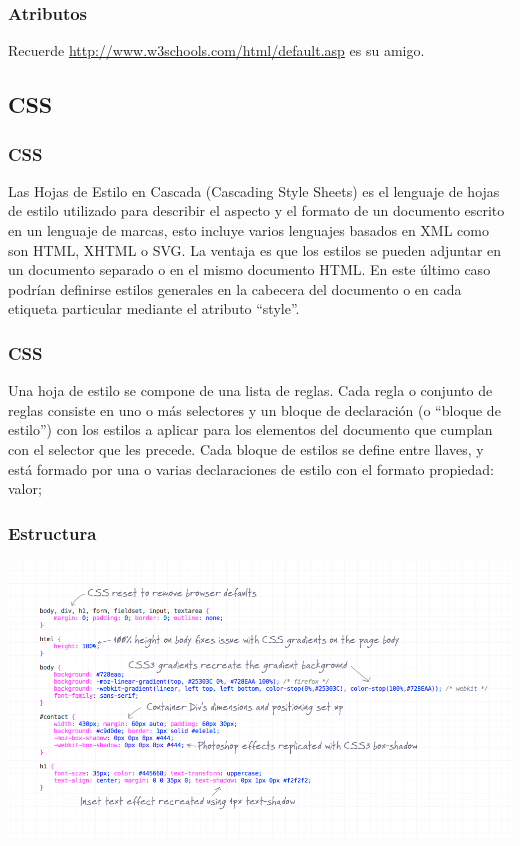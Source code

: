 \documentclass[12pt]{beamer}
\begin{document}
\begin{frame}
 \frametitle{Atributos}
 Recuerde \href{http://www.w3schools.com/html/default.asp}{http://www.w3schools.com/html/default.asp} es su amigo.
\end{frame}

\subsection{CSS}

\begin{frame}
 \frametitle{CSS}
 Las Hojas de Estilo en Cascada (Cascading Style Sheets) es el lenguaje de hojas de estilo utilizado para describir el aspecto y el formato de un documento escrito en un lenguaje de marcas, esto incluye varios lenguajes basados en XML como son HTML, XHTML o SVG.
 \newline
 La ventaja es que los estilos se pueden adjuntar en un documento separado o en el mismo documento HTML. En este último caso podrían definirse estilos generales en la cabecera del documento o en cada etiqueta particular mediante el atributo ``style''.
\end{frame}

\begin{frame}
 \frametitle{CSS}
 Una hoja de estilo se compone de una lista de reglas. Cada regla o conjunto de reglas consiste en uno o más selectores y un bloque de declaración (o ``bloque de estilo'') con los estilos a aplicar para los elementos del documento que cumplan con el selector que les precede. 
 Cada bloque de estilos se define entre llaves, y está formado por una o varias declaraciones de estilo con el formato \alert{propiedad: valor;}
\end{frame}


\begin{frame}
 \frametitle{Estructura}
 \begin{center}
    \includegraphics[scale=0.35]{img/css1.png}
 \end{center}
\end{frame}
\end{document}
